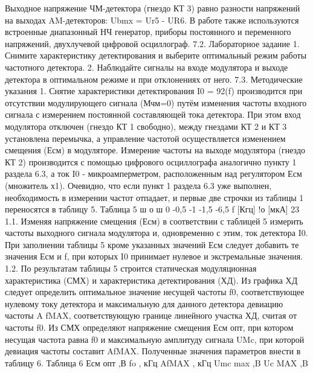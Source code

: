 ﻿\documentclass[a4paper,12pt]{article}
\begin{document}
Выходное напряжение ЧМ-детектора (гнездо КТ 3) равно разности напряжений на выходах AM-детекторов: Ubmx = Ur5 - UR6.
В работе также используются встроенные диапазонный НЧ генератор, приборы постоянного и переменного напряжений, двухлучевой цифровой осциллограф.
7.2.	Лабораторное задание
1.	Снимите характеристику детектирования и выберите оптимальный режим работы частотного детектора.
2.	Наблюдайте сигналы на входе модулятора и выходе детектора в оптимальном режиме и при отклонениях от него.
7.3.	Методические указания
1.	Снятие характеристики детектирования	I0 = 92(f) производится при отсутствии
модулирующего сигнала (Мчм=0) путём изменения частоты входного сигнала с измерением постоянной составляющей тока детектора. При этом вход модулятора отключен (гнездо КТ 1 свободно), между гнездами КТ 2 и КТ 3 установлена перемычка, а управление частотой осуществляется изменением смещения (Есм) в модуляторе. Измерение частоты на выходе модулятора (гнездо КТ 2) производится с помощью цифрового осциллографа аналогично пункту 1 раздела 6.3, а ток I0	-
микроамперметром, расположенным над регулятором Есм (множитель х1). Очевидно, что если пункт 1 раздела 6.3 уже выполнен, необходимость в измерении частот отпадает, и первые две строчки из таблицы 1 переносятся в таблицу 5.
Таблица 5
ш о ш	0	-0,5	-1	-1,5		-6,5
f [Кгц]						
!о [мкА]						
23
1.1.	Изменяя напряжение смещения (Есм) в соответствии с таблицей 5 измерить частоты выходного сигнала модулятора и, одновременно с этим, ток детектора I0. При заполнении таблицы 5 кроме указанных значений Есм следует добавить те значения Есм и f, при которых I0 принимает нулевое и экстремальные значения.
1.2.	По результатам таблицы 5 строится статическая модуляционная характеристика (СМХ) и характеристика детектирования (ХД). Из графика ХД следует определить оптимальное значение несущей частоты f0, соответствующее нулевому току детектора и максимальную для данного детектора девиацию частоты A fMAX, соответствующую границе линейного участка ХД, считая от частоты f0. Из СМХ определяют напряжение смещения Есм опт, при котором несущая частота равна f0 и максимальную амплитуду сигнала UMc, при которой девиация частоты составит AfMAX. Полученные значения параметров внести в таблицу 6.
Таблица 6
Есм опт ,В	fo , кГц	AfMAX , кГц	Umc max ,B	Uc MAX ,B
				
\end{document}
